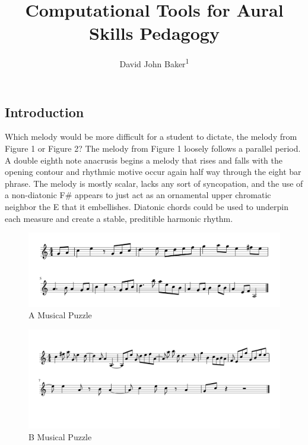 \documentclass[english,man,floatsintext]{apa6}
\author{David John Baker\textsuperscript{1}}
\affiliation{
\vspace{0.5cm}
\textsuperscript{1} Louisiana State University}
\title{Computational Tools for Aural Skills Pedagogy}
\date{}
\begin{document}
\maketitle

\hypertarget{introduction}{%
\subsection{Introduction}\label{introduction}}

Which melody would be more difficult for a student to dictate, the melody from Figure 1 or Figure 2?
The melody from Figure 1 loosely follows a parallel period.
A double eighth note anacrusis begins a melody that rises and falls with the opening contour and rhythmic motive occur again half way through the eight bar phrase.
The melody is mostly scalar, lacks any sort of syncopation, and the use of a non-diatonic F\# appears to just act as an ornamental upper chromatic neighbor the E that it embellishes.
Diatonic chords could be used to underpin each measure and create a stable, preditible harmonic rhythm.

\begin{figure}
\includegraphics[width=1\linewidth]{../figures/musical_puzzles/musical_puzzle_a} \caption{A Musical Puzzle}\label{fig:unnamed-chunk-1}
\end{figure}

\begin{figure}
\includegraphics[width=1\linewidth]{../figures/musical_puzzles/musical_puzzle_b} \caption{B Musical Puzzle}\label{fig:unnamed-chunk-2}
\end{figure}
\end{document}
